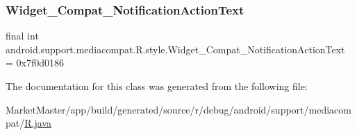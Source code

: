 \mbox{\label{classandroid_1_1support_1_1mediacompat_1_1R_1_1style_a5b36689f13a047070defb7a11fd23580}} 
\subsubsection{\texorpdfstring{Widget\+\_\+\+Compat\+\_\+\+Notification\+Action\+Text}{Widget\_Compat\_NotificationActionText}}
{\footnotesize\ttfamily final int android.\+support.\+mediacompat.\+R.\+style.\+Widget\+\_\+\+Compat\+\_\+\+Notification\+Action\+Text = 0x7f0d0186\hspace{0.3cm}{\ttfamily [static]}}



The documentation for this class was generated from the following file\+:\begin{DoxyCompactItemize}
\item 
Market\+Master/app/build/generated/source/r/debug/android/support/mediacompat/\mbox{\hyperlink{debug_2android_2support_2mediacompat_2R_8java}{R.\+java}}\end{DoxyCompactItemize}
